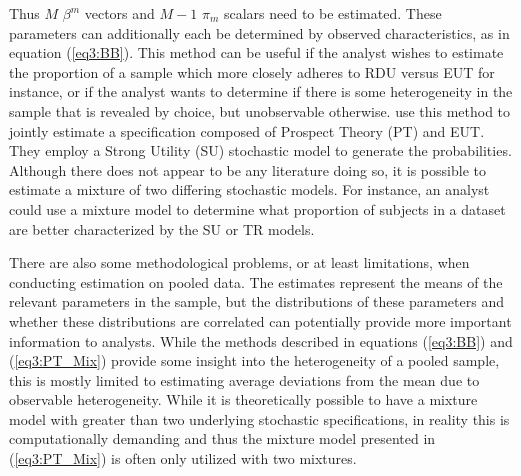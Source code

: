 \documentclass[../main.tex]{subfiles}
\begin{document}
\noindent Thus $M$ $\beta^m$ vectors and $M-1$ $\pi_m$ scalars need to be estimated.
These parameters can additionally each be determined by observed characteristics, as in equation (\ref{eq3:BB}).
This method can be useful if the analyst wishes to estimate the proportion of a sample which more closely adheres to RDU versus EUT for instance, or if the analyst wants to determine if there is some heterogeneity in the sample that is revealed by choice, but unobservable otherwise.
\textcite[141]{Harrison2009} use this method to jointly estimate a specification composed of Prospect Theory (PT) and EUT.
They employ a Strong Utility (SU) stochastic model to generate the probabilities.
Although there does not appear to be any literature doing so, it is possible to estimate a mixture of two differing stochastic models.
For instance, an analyst could use a mixture model to determine what proportion of subjects in a dataset are better characterized by the SU or TR models.{\footnotemark}

\addtocounter{footnote}{-1}

There are also some methodological problems, or at least limitations, when conducting estimation on pooled data.
The estimates represent the means of the relevant parameters in the sample, but the distributions of these parameters and whether these distributions are correlated can potentially provide more important information to analysts.{\footnotemark}
While the methods described in equations (\ref{eq3:BB}) and (\ref{eq3:PT_Mix}) provide some insight into the heterogeneity of a pooled sample, this is mostly limited to estimating average deviations from the mean due to observable heterogeneity.
While it is theoretically possible to have a mixture model with greater than two underlying stochastic specifications, in reality this is computationally demanding and thus the mixture model presented in (\ref{eq3:PT_Mix}) is often only utilized with two mixtures.
\end{document}
